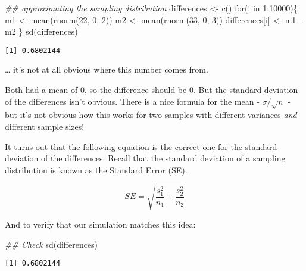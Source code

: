 \documentclass[
  letterpaper,
  DIV=11,
  numbers=noendperiod]{scrreprt}
\newenvironment{Shaded}{\begin{snugshade}}{\end{snugshade}}
\newcommand{\ControlFlowTok}[1]{\textcolor[rgb]{0.00,0.23,0.31}{#1}}
\newcommand{\DecValTok}[1]{\textcolor[rgb]{0.68,0.00,0.00}{#1}}
\newcommand{\DocumentationTok}[1]{\textcolor[rgb]{0.37,0.37,0.37}{\textit{#1}}}
\newcommand{\FunctionTok}[1]{\textcolor[rgb]{0.28,0.35,0.67}{#1}}
\newcommand{\NormalTok}[1]{\textcolor[rgb]{0.00,0.23,0.31}{#1}}
\newcommand{\OtherTok}[1]{\textcolor[rgb]{0.00,0.23,0.31}{#1}}
\newcommand{\SpecialCharTok}[1]{\textcolor[rgb]{0.37,0.37,0.37}{#1}}
\begin{document}
\begin{Shaded}
\begin{Highlighting}[]
\DocumentationTok{\#\# approximating the sampling distribution}
\NormalTok{differences }\OtherTok{\textless{}{-}} \FunctionTok{c}\NormalTok{()}
\ControlFlowTok{for}\NormalTok{(i }\ControlFlowTok{in} \DecValTok{1}\SpecialCharTok{:}\DecValTok{10000}\NormalTok{)\{}
\NormalTok{    m1 }\OtherTok{\textless{}{-}} \FunctionTok{mean}\NormalTok{(}\FunctionTok{rnorm}\NormalTok{(}\DecValTok{22}\NormalTok{, }\DecValTok{0}\NormalTok{, }\DecValTok{2}\NormalTok{))}
\NormalTok{    m2 }\OtherTok{\textless{}{-}} \FunctionTok{mean}\NormalTok{(}\FunctionTok{rnorm}\NormalTok{(}\DecValTok{33}\NormalTok{, }\DecValTok{0}\NormalTok{, }\DecValTok{3}\NormalTok{))}
\NormalTok{    differences[i] }\OtherTok{\textless{}{-}}\NormalTok{ m1 }\SpecialCharTok{{-}}\NormalTok{ m2}
\NormalTok{\}}
\FunctionTok{sd}\NormalTok{(differences)}
\end{Highlighting}
\end{Shaded}

\begin{verbatim}
[1] 0.6802144
\end{verbatim}

\ldots{} it's not at all obvious where this number comes from.

Both had a mean of 0, so the difference should be 0. But the standard
deviation of the differences isn't obvious. There is a nice formula for
the mean - \(\sigma/\sqrt{n}\) - but it's not obvious how this works for
two samples with different variances \emph{and} different sample sizes!

It turns out that the following equation is the correct one for the
standard deviation of the differences. Recall that the standard
deviation of a sampling distribution is known as the Standard Error
(SE).

\[
SE = \sqrt{\frac{s_1^2}{n_1} + \frac{s_2^2}{n_2}}
\]

And to verify that our simulation matches this idea:

\begin{Shaded}
\begin{Highlighting}[]
\DocumentationTok{\#\# Check}
\FunctionTok{sd}\NormalTok{(differences)}
\end{Highlighting}
\end{Shaded}

\begin{verbatim}
[1] 0.6802144
\end{verbatim}
\end{document}
